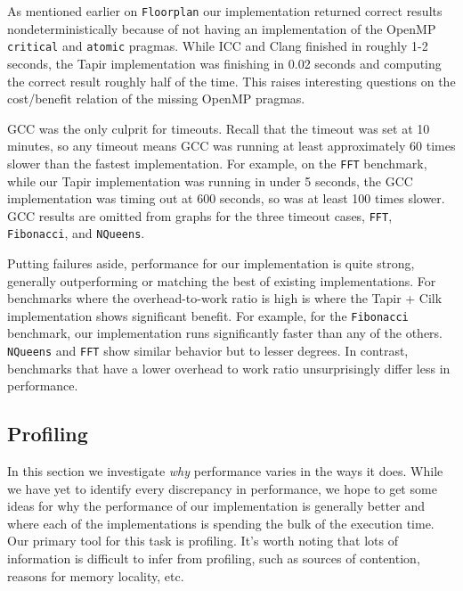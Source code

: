 \documentclass[sigconf]{acmart}
\begin{document}
As mentioned earlier on \texttt{Floorplan} our implementation returned correct
results nondeterministically because of not having an implementation of the OpenMP
\texttt{critical} and \texttt{atomic} pragmas. While ICC and Clang finished in
roughly 1-2 seconds, the Tapir implementation was finishing in 0.02 seconds
and computing the correct result roughly half of the time. This raises interesting
questions on the cost/benefit relation of the missing OpenMP pragmas.

GCC was the only culprit for timeouts. Recall that the timeout was set at 10
minutes, so any timeout means GCC was running at least approximately 60 times
slower than the fastest implementation. For example, on the \texttt{FFT}
benchmark, while our Tapir implementation was running in under 5 seconds, the
GCC implementation was timing out at 600 seconds, so was at least 100 times
slower. GCC results are omitted from graphs for the three timeout cases,
\texttt{FFT}, \texttt{Fibonacci}, and \texttt{NQueens}.

Putting failures aside, performance for our implementation is quite strong,
generally outperforming or matching the best of existing implementations. For
benchmarks where the overhead-to-work ratio is high is where the Tapir + Cilk
implementation shows significant benefit. For example, for the
\texttt{Fibonacci} benchmark, our implementation runs significantly faster than
any of the others. \texttt{NQueens} and \texttt{FFT} show similar behavior but
to lesser degrees. In contrast, benchmarks that have a lower overhead to work
ratio unsurprisingly differ less in performance.

\subsection{Profiling}

In this section we investigate \emph{why} performance varies in the ways it
does. While we have yet to identify every discrepancy in performance, we hope
to get some ideas for why the performance of our implementation is generally
better and where each of the implementations is spending the bulk of the
execution time. Our primary tool for this task is profiling. It's worth noting
that lots of information is difficult to infer from profiling, such as sources
of contention, reasons for memory locality, etc.
\end{document}
